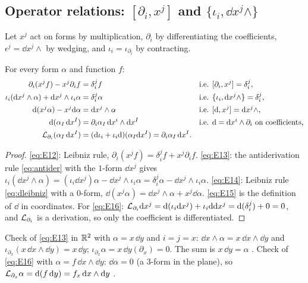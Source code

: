\subsection{Operator relations: $[\partial_i,x^j]$ and $\{\iota_i,\dd x^j\wedge\}$}\label{sec:operators}

Let $x^j$ act on forms by multiplication, $\partial_i$ by differentiating the coefficients, $\epsilon^j=\dd x^j\wedge$ by wedging, and $\iota_i=\iota_{\partial_i}$ by contracting.

\begin{proposition}\label{prop:operators}
For every form $\alpha$ and function $f$:
\begin{align}
\partial_i(x^jf)-x^j\partial_if&=\delta^j_if &&\text{i.e. }[\partial_i,x^j]=\delta^j_i,\label{eq:E12}\\
\iota_i(\dd x^j\wedge\alpha)+\dd x^j\wedge\iota_i\alpha&=\delta^j_i\alpha &&\text{i.e. }\{\iota_i,\dd x^j\wedge\}=\delta^j_i,\label{eq:E13}\\
\dd(x^j\alpha)-x^j\dd\alpha&=\dd x^j\wedge\alpha &&\text{i.e. }[\dd,x^j]=\dd x^j\wedge,\label{eq:E14}\\
\dd(\alpha_I\,\dd x^I)&=\partial_i\alpha_I\,\dd x^i\wedge\dd x^I &&\text{i.e. }\dd=\dd x^i\wedge\partial_i\text{ on coefficients,}\label{eq:E15}\\
\Lie_{\partial_i}(\alpha_I\,\dd x^I)&=(\dd\iota_i+\iota_i\dd)(\alpha_I\dd x^I)=\partial_i\alpha_I\,\dd x^I.\label{eq:E16}
\end{align}
\end{proposition}
\begin{proof}
\eqref{eq:E12}: Leibniz rule, $\partial_i(x^jf)=\delta^j_if+x^j\partial_if$. \eqref{eq:E13}: the antiderivation rule \eqref{eq:antider} with the $1$-form $\dd x^j$ gives $\iota_i(\dd x^j\wedge\alpha)=(\iota_i\dd x^j)\alpha-\dd x^j\wedge\iota_i\alpha=\delta^j_i\alpha-\dd x^j\wedge\iota_i\alpha$. \eqref{eq:E14}: Leibniz rule \eqref{eq:dleibniz} with a $0$-form, $\dd(x^j\alpha)=\dd x^j\wedge\alpha+x^j\dd\alpha$. \eqref{eq:E15} is the definition of $\dd$ in coordinates. For \eqref{eq:E16}: $\mathcal{L}_{\partial_i}\mathrm{d} x^j=\mathrm{d}(\iota_i\mathrm{d} x^j)+\iota_i\mathrm{d}\mathrm{d} x^j=\mathrm{d}(\delta^j_i)+0=0$, and $\mathcal{L}_{\partial_i}$ is a derivation, so only the coefficient is differentiated.
\end{proof}
\numcheck Check of \eqref{eq:E13} in $\mathbb{R}^2$ with $\alpha=x\,\dd y$ and $i=j=x$: $\dd x\wedge\alpha=x\,\dd x\wedge\dd y$ and $\iota_{\partial_x}(x\,\dd x\wedge\dd y)=x\,\dd y$; $\iota_{\partial_x}\alpha=x\,\dd y(\partial_x)=0$. The sum is $x\,\dd y=\alpha$ \checkmark.
Check of \eqref{eq:E16} with $\alpha=f\,\dd x\wedge\dd y$: $\dd\alpha=0$ (a $3$-form in the plane), so $\mathcal{L}_{\partial_x}\alpha=\mathrm{d}(f\,\mathrm{d} y)=f_x\,\mathrm{d} x\wedge\mathrm{d} y$ \checkmark.

